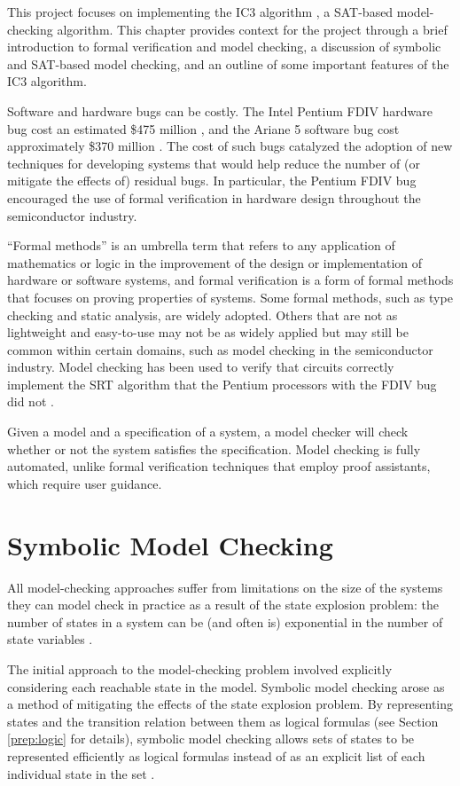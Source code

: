 \documentclass[12pt,a4paper,twoside,openright]{report}
\begin{document}
This project focuses on implementing the IC3 algorithm
\cite{bradley11}, a SAT-based model-checking
algorithm.
This chapter provides context for the project through a
brief introduction to formal verification and model checking,
a discussion of symbolic and SAT-based model checking,
and an outline of some important features of the IC3 algorithm.

Software and hardware bugs can be costly. The Intel Pentium FDIV hardware bug cost an
estimated \$475 million \cite{pratt95}, and the Ariane 5 software bug cost
approximately \$370 million \cite{dowson97}.
The cost of such bugs catalyzed the adoption of new techniques for developing systems
that would help reduce the number of (or mitigate the effects of) residual bugs.
In particular, the Pentium FDIV bug encouraged the use of formal verification in
hardware design throughout the semiconductor industry.

``Formal methods'' is an umbrella term that refers to any application of mathematics or logic
in the improvement of the design or implementation of hardware or software systems,
and formal verification is a form of formal methods that focuses on proving
properties of systems.
Some formal methods, such as type checking and static analysis, are widely
adopted. Others that are not as lightweight and easy-to-use
may not be as widely applied but may still be common within certain
domains, such as model checking in the semiconductor industry.
Model checking has been used to verify that circuits correctly implement the SRT
algorithm that the Pentium processors with the FDIV bug did not \cite{clarke96}.

Given a model and a specification of a system, a model checker will check whether or
not the system satisfies the specification.
Model checking is fully automated, unlike formal verification techniques that employ
proof assistants, which require user guidance.

\section{Symbolic Model Checking}

All model-checking approaches suffer from limitations on the size
of the systems they can model check in practice as a result of
the state explosion problem: the number of
states in a system can be (and often is) exponential in the
number of state variables \cite{clarke12}. 

The initial approach to the model-checking problem involved explicitly
considering each reachable state in the model.
Symbolic model checking arose as a method of mitigating the effects of
the state explosion problem. By representing
states and the transition relation between them as logical formulas
(see Section \ref{prep:logic} for details),
symbolic model checking allows sets of states to be
represented efficiently as logical formulas
instead of as an explicit list of each individual state in the set
\cite{mcmillan92}. 
\end{document}
